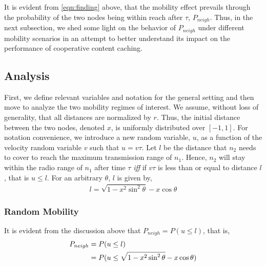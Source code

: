 \documentclass[conference,a4paper]{IEEEtran}
\begin{document}
It is evident from \eqref{eqn:finding} above, that the mobility effect prevails through the probability of the two nodes being within reach after $\tau$, $P_{neigh}$. Thus, in the next subsection, we shed some light on the behavior of $P_{neigh}$ under different mobility scenarios in an attempt to better understand its impact on the performance of cooperative content caching.

\subsection{Analysis}
First, we define relevant variables and notation for the general setting and then move to analyze the two mobility regimes of interest. We assume, without loss of generality, that all distances are normalized by $r$. Thus, the initial distance between the two nodes, denoted $x$, is uniformly distributed over $[-1, 1]$. For notation convenience, we introduce a new random variable, $u$, as a function of the velocity random variable $v$ such that $u = v\tau$. Let $l$ be the distance that $n_2$ needs to cover to reach the maximum transmission range of $n_1$. Hence, $n_2$ will stay within the radio range of $n_1$ after time $\tau$ {\it iff} if $v\tau$ is less than or equal to distance $l$, that is $u \le l$. For an arbitrary $\theta$, $l$ is given by,
\begin{align}
l = \sqrt{1-x^2 \sin^2{\theta}} - x \cos{\theta}
\end{align}

\subsubsection{Random Mobility}
It is evident from the discussion above that $P_{neigh} = P(u \le l)$, that is,
\begin{align}
P_{neigh} &= P(u \leq l) \notag \\ &= P(u \leq \sqrt{1-x^2 \sin^2{\theta}} - x \cos{\theta}) \label{eqn:prob_rand_mob}
\end{align}
\end{document}
